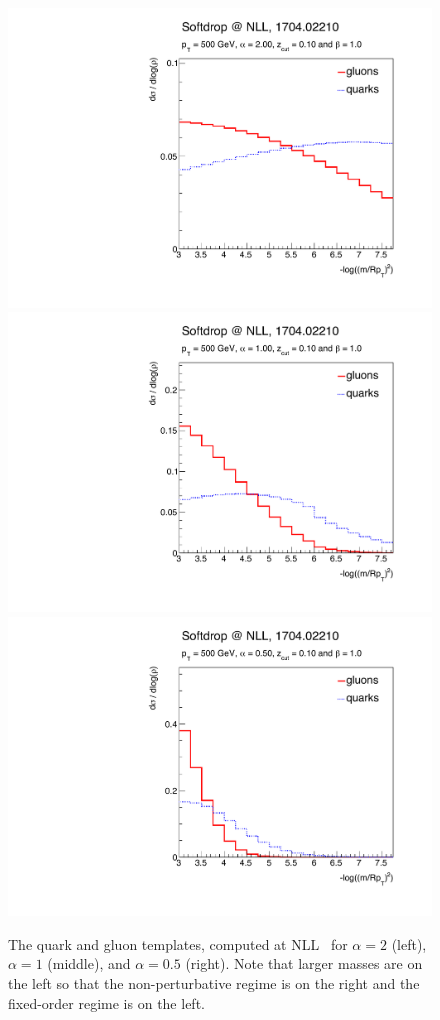\begin{figure}[h!]
\begin{center}
\includegraphics[width = 0.33\columnwidth]{figures/PDFs_alpha_2_00zcut0_10_beta_1_00.pdf}\includegraphics[width = 0.33\columnwidth]{figures/PDFs_alpha_1_00zcut0_10_beta_1_00.pdf}\includegraphics[width = 0.33\columnwidth]{figures/PDFs_alpha_0_50zcut0_10_beta_1_00.pdf}
\end{center}
\caption{The quark and gluon templates, computed at NLL~\cite{Marzani:2017mva,Marzani:2017kqd} for $\alpha=2$ (left), $\alpha=1$ (middle), and $\alpha=0.5$ (right).  Note that larger masses are on the left so that the non-perturbative regime is on the right and the fixed-order regime is on the left.}
\label{fig:templates}
\end{figure}
	
